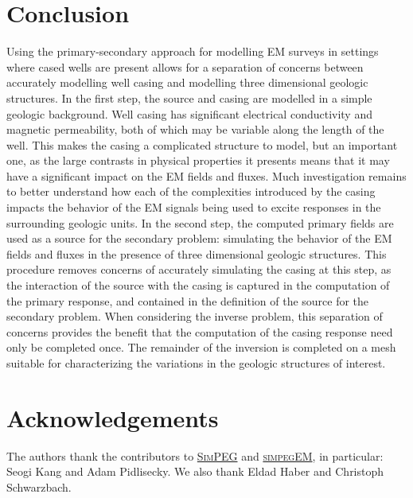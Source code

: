 \documentclass{segabs}
\newcommand{\SimPEG}{\textsc{SimPEG}\xspace}
\newcommand{\simpegEM}{\textsc{simpegEM}\xspace}
\begin{document}
\section{Conclusion}
Using the primary-secondary approach for modelling EM surveys in settings where cased wells are present allows for a separation of concerns between accurately modelling well casing and modelling three dimensional geologic structures. In the first step, the source and casing are modelled in a simple geologic background.
Well casing has significant electrical conductivity and magnetic permeability, both of which may be variable along the length of the well. This makes the casing a complicated structure to model, but an important one, as the large contrasts in physical properties it presents means that it may have a significant impact on the EM fields and fluxes.
Much investigation remains to better understand how each of the complexities introduced by the casing impacts the behavior of the EM signals being used to excite responses in the surrounding geologic units. In the second step, the computed primary fields are used as a source for the secondary problem: simulating the behavior of the EM fields and fluxes in the presence of three dimensional geologic structures. This procedure removes concerns of accurately simulating the casing at this step, as the interaction of the source with the casing is captured in the computation of the primary response, and contained in the definition of the source for the secondary problem. When considering the inverse problem, this separation of concerns provides the benefit that the computation of the casing response need only be completed once. The remainder of the inversion is completed on a mesh suitable for characterizing the variations in the geologic structures of interest.

\section{Acknowledgements}
The authors thank the contributors to \href{http://simpeg.xyz}{\SimPEG}  and \href{https://github.com/simpeg/simpegem}{\simpegEM}, in particular: Seogi Kang and Adam Pidlisecky. We also thank Eldad Haber and Christoph Schwarzbach.

\onecolumn



\end{document}
